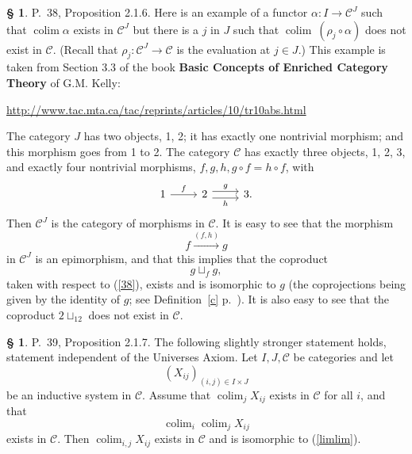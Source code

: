 \documentclass[12pt]{article}%
\theoremstyle{remark}
\theoremstyle{definition}
\newtheorem{s}[thm]{\S}%
\newcommand{\C}{\mathcal C}
\DeclareMathOperator*{\colim}{colim}
\begin{document}
\begin{s}\label{c38}
P.~38, Proposition 2.1.6. Here is an example of a functor $\alpha:I\to\C^J$ such that $\colim\alpha$ exists in $\C^J$ but there is a $j$ in $J$ such that $\colim\ (\rho_j\circ\alpha)$ does not exist in $\C$. (Recall that $\rho_j:\C^J\to\C$ is the evaluation at $j\in J$.) This example is taken from Section 3.3 of the book \textbf{Basic Concepts of Enriched Category Theory} of G.M. Kelly:%
%
\begin{center}\href{http://www.tac.mta.ca/tac/reprints/articles/10/tr10abs.html}{http://www.tac.mta.ca/tac/reprints/articles/10/tr10abs.html}
\end{center}

The category $J$ has two objects, 1, 2; it has exactly one nontrivial morphism; and this morphism goes from 1 to 2. The category $\C$ has exactly three objects, 1, 2, 3, and exactly four nontrivial morphisms, $f,g,h,g\circ f=h\circ f$, with 
$$
\begin{tikzcd}
1\ar{r}{f}&2\ar[yshift=.7ex]{r}{g}\ar[yshift=-.7ex]{r}[swap]{h}&3.
\end{tikzcd}
$$ 
Then $\C^J$ is the category of morphisms in $\C$. It is easy to see that the morphism 
%
\begin{equation}\label{38}
f\xrightarrow{(f,h)}g 
\end{equation}
%
in $\C^J$ is an epimorphism, and that this implies that the coproduct 
$$
g\sqcup_fg,
$$ 
taken with respect to (\ref{38}), exists and is isomorphic to $g$ (the coprojections being given by the identity of $g$; see Definition~\ref{c} p.~\pageref{c}). It is also easy to see that the coproduct $2\sqcup_12$ does not exist in $\C$.
\end{s}

%

\begin{s} 
P.~39, Proposition 2.1.7. The following slightly stronger statement holds, statement independent of the Universes Axiom. Let $I, J, \C$ be categories and let 
$$
(X_{ij})_{(i,j)\in I\times J}
$$ 
be an inductive system in $\C$. Assume that $\colim_jX_{ij}$ exists in $\C$ for all $i$, and that 
\begin{equation}\label{limlim}
\colim_i\colim_jX_{ij}
\end{equation}
exists in $\C$. Then $\colim_{i,j}X_{ij}$ exists in $\C$ and is isomorphic to (\ref{limlim}).
\end{s}

%
\end{document}
